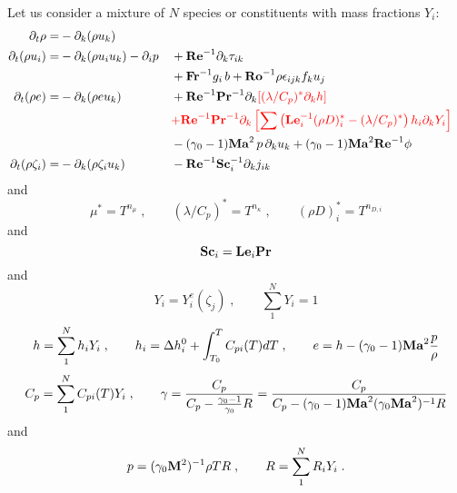 Let us consider a mixture of $N$ species or constituents with mass fractions $Y_i$:
\begin{subequations}
  \begin{align}
    \partial_t \rho       =& -\partial_k (\rho u_k)                                                \\
    \partial_t (\rho u_i) =& -\partial_k (\rho u_i u_k )-\partial_i p
    && +\mathrm{\bf Re}^{-1}\partial_k \tau_{ik}                                                    \nonumber\\
    & && +\mathrm{\bf Fr}^{-1} g_i\,b +\mathrm{\bf Ro}^{-1}\rho\epsilon_{ijk} f_ku_j                                     \\
    \partial_t (\rho e)   =& -\partial_k (\rho e u_k )
    && +\mathrm{\bf Re}^{-1}\mathrm{\bf Pr}^{-1}\partial_k\color{red}{\left[(\lambda/C_p)^{*}\partial_kh\right]}\nonumber\\
    & && \color{red}{+\mathrm{\bf Re}^{-1}\mathrm{\bf Pr}^{-1} \partial_k\left[\sum\left(\mathrm{\bf Le}_i^{-1}(\rho D)_i^*
    -(\lambda/C_p)^*\right)h_i \partial_k  Y_i\right]}                                  \nonumber\\
    & && -(\gamma_0-1)\mathrm{\bf Ma}^2\,p\, \partial_k u_k  + (\gamma_0-1)\mathrm{\bf Ma}^2\mathrm{\bf Re}^{-1}\phi                 \\
    \partial_t (\rho \zeta_i)=& -\partial_k (\rho \zeta_i u_k)
    && -\mathrm{\bf Re}^{-1}\mathrm{\bf Sc}_i^{-1} \partial_k j_{ik}
  \end{align}
\end{subequations}
and
\begin{equation}
  \mu^{*} = T^{n_\mu}\;,\qquad (\lambda/C_p)^{*} = T^{n_\kappa} \;,\qquad (\rho
  D)_i^{*} = T^{n_{D,i}}
\end{equation}
and
\begin{equation}
  \mathrm{\bf Sc}_i = \mathrm{\bf Le}_i \mathrm{\bf Pr}
\end{equation}
and
\begin{equation}
  Y_i = Y^e_i(\zeta_j)\;, \qquad \sum^N_1 Y_i=1
\end{equation}
\begin{equation}
  h = \sum^N_1 h_{i} Y_i \;,\qquad h_{i} = \Delta h^0_i + \int^{T}_{T_0}
  C_{pi}(T) dT\;,\qquad e = h - (\gamma_0-1)\mathrm{\bf Ma}^2\frac{p}{\rho}
\end{equation}
\begin{equation}
  C_p = \sum^N_1 C_{pi}(T) Y_i\;,\qquad
  \gamma = \frac{C_p}{C_p-\frac{\gamma_0-1}{\gamma_0}R}=\frac{C_p}{C_p-(\gamma_0-1)\mathrm{\bf Ma}^2(\gamma_0\mathrm{\bf Ma}^2)^{-1}R}
\end{equation}
and
\begin{equation}
  p = (\gamma_0 \mathrm{\bf M}^2)^{-1}\rho T R \;,\qquad
  R =\sum^N_1 R_iY_i\;.
\end{equation}
